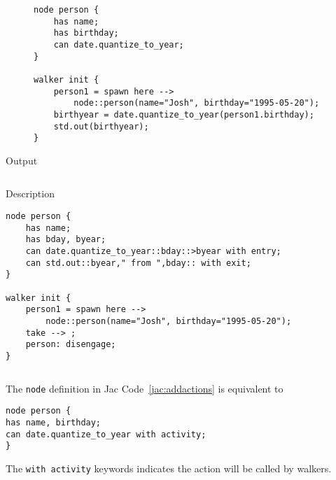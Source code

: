 \begin{description}
    \begin{lstlisting}[caption={Adding actions to architypes},label=jac:addactions]
node person {
    has name;
    has birthday;
    can date.quantize_to_year;
}

walker init {
    person1 = spawn here -->
        node::person(name="Josh", birthday="1995-05-20");
    birthyear = date.quantize_to_year(person1.birthday);
    std.out(birthyear);
}
    \end{lstlisting}
    \item[Output] \texttt{}
          \begin{lstlisting}[language=shell]
        \end{lstlisting}
    \item[Description] \texttt{}

\end{description}


\begin{description}
    \begin{lstlisting}[caption={Triggering actions on entry and exit}]
node person {
    has name;
    has bday, byear;
    can date.quantize_to_year::bday::>byear with entry;
    can std.out::byear," from ",bday:: with exit;
}

walker init {
    person1 = spawn here -->
        node::person(name="Josh", birthday="1995-05-20");
    take --> ;
    person: disengage;
}
    \end{lstlisting}
    \item[Output] \texttt{}
          \begin{lstlisting}[language=shell]
        \end{lstlisting}
    \item[Description] \texttt{}

          \begin{remark}
              \begin{tBox}
                  The \lstinline{node} definition in Jac Code~\ref{jac:addactions} is equivalent to
                  \begin{lstlisting}
node person {
has name, birthday;
can date.quantize_to_year with activity;
}
        \end{lstlisting}
                  The \lstinline{with activity} keywords indicates the action will be called by walkers.
              \end{tBox}
          \end{remark}

\end{description}

